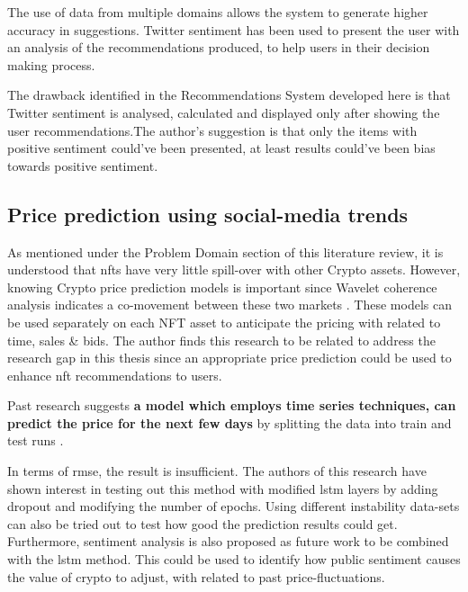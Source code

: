 The use of data from multiple domains allows the system to generate higher accuracy in suggestions. Twitter sentiment has been used to present the user with an analysis of the recommendations produced, to help users in their decision making process.

The drawback identified in the Recommendations System developed here is that Twitter sentiment is analysed, calculated and displayed only after showing the user recommendations.The author's suggestion is that only the items with positive sentiment could've been presented, at least results could've been bias towards positive sentiment.


\subsection{Price prediction using social-media trends}



As mentioned under the Problem Domain section of this literature review, it is understood that \gls{nft}s have very little spill-over with other Crypto assets. However, knowing Crypto price prediction models is important since Wavelet coherence analysis indicates a co-movement between these two markets \autocite{dowling_is_2021}.
These models can be used separately on each NFT asset to anticipate the pricing with related to time, sales \& bids.
The author finds this research to be related to address the research gap in this thesis since an appropriate price prediction could be used to enhance \Gls{nft}  recommendations to users.

Past research suggests \textbf{a model which employs time series techniques, can predict the price for the next few days} by splitting the data into train and test runs \autocite{ferdiansyah_lstm-method_2019}.

In terms of \gls{rmse}, the result is insufficient. The authors of this research have shown interest in testing out this method with modified \gls{lstm} layers by adding dropout and modifying the number of epochs. Using different instability data-sets can also be tried out to test how good the prediction results could get. 
Furthermore, sentiment analysis is also proposed as future work to be combined with the \gls{lstm} method. This could be used to identify how public sentiment causes the value of crypto to adjust, with related to past price-fluctuations.

